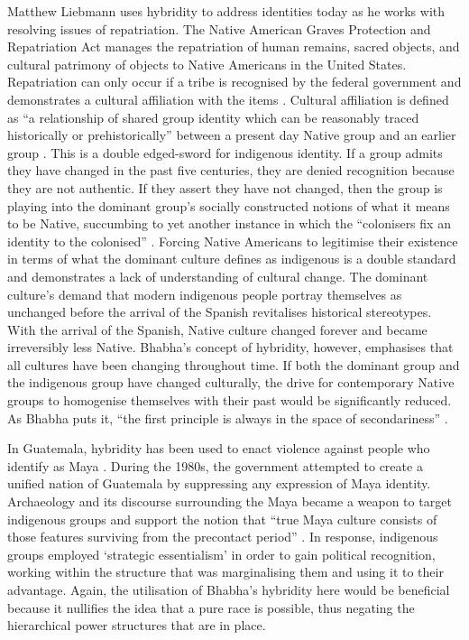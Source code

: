 	Matthew Liebmann uses hybridity to address identities today as he works with resolving issues of repatriation. The Native American Graves Protection and Repatriation Act manages the repatriation of human remains, sacred objects, and cultural patrimony of objects to Native Americans in the United States. Repatriation can only occur if a tribe is recognised by the federal government and demonstrates a cultural affiliation with the items \parencite[74] {Liebmann_2008}. Cultural affiliation is defined as “a relationship of shared group identity which can be reasonably traced historically or prehistorically” between a present day Native group and an earlier group  \parencite[75] {Liebmann_2008}. This is a double edged-sword for indigenous identity. If a group admits they have changed in the past five centuries, they are denied recognition because they are not authentic. If they assert they have not changed, then the group is playing into the dominant group’s socially constructed notions of what it means to be Native, succumbing to yet another instance in which the “colonisers fix an identity to the colonised” \parencite [77] {Anzaldua_1987}. Forcing Native Americans to legitimise their existence in terms of what the dominant culture defines as indigenous is a double standard and demonstrates a lack of understanding of cultural change. The dominant culture’s demand that modern indigenous people portray themselves as unchanged before the arrival of the Spanish revitalises historical stereotypes. With the arrival of the Spanish, Native culture changed forever and became irreversibly less Native. Bhabha’s concept of hybridity, however, emphasises that all cultures have been changing throughout time. If both the dominant group and the indigenous group have changed culturally, the drive for contemporary Native groups to homogenise themselves with their past would be significantly reduced. As Bhabha puts it, “the first principle is always in the space of secondariness” \parencite  [83] {Mitchell_1995}.
	
	In Guatemala, hybridity has been used to enact violence against people who identify as Maya \parencite [6] {Warren_1998}. During the 1980s, the government attempted to create a unified nation of Guatemala by suppressing any expression of Maya identity. Archaeology and its discourse surrounding the Maya became a weapon to target indigenous groups and support the notion that “true Maya culture consists of those features surviving from the precontact period” \parencite [13]{FischerBrown_1996}. In response, indigenous groups employed ‘strategic essentialism’ \parencite [11-13]{Spivak_1990} in order to gain political recognition, working within the structure that was marginalising them and using it to their advantage. Again, the utilisation of Bhabha’s hybridity here would be beneficial because it nullifies the idea that a pure race is possible, thus negating the hierarchical power structures that are in place.
	
